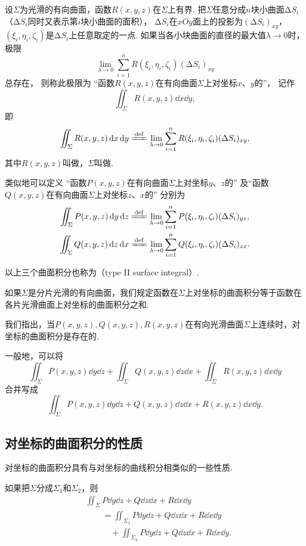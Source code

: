 设\(\Sigma\)为光滑的有向曲面，函数\(R(x,y,z)\)在\(\Sigma\)上有界.
把\(\Sigma\)任意分成\(n\)块小曲面\(\increment S_i\)%
（\(\increment S_i\)同时又表示第\(i\)块小曲面的面积），
\(\increment S_i\)在\(xOy\)面上的投影为\((\increment S_i)_{xy}\)，
\((\xi_i,\eta_i,\zeta_i)\)是\(\increment S_i\)上任意取定的一点.
如果当各小块曲面的直径的最大值\(\lambda\to0\)时，极限\[
	\lim_{\lambda\to0}
	\sum_{i=1}^n
	R(\xi_i,\eta_i,\zeta_i)
	(\increment S_i)_{xy}
\]总存在，
则称此极限为
“函数\(R(x,y,z)\)在有向曲面\(\Sigma\)上对坐标\(x\)、\(y\)的”，
记作\[
	\iint_\Sigma R(x,y,z) \dd{x}\dd{y},
\]
即\[
	\iint_\Sigma R(x,y,z) \dd{x}\dd{y}
	\defeq
	\lim_{\lambda\to0}
	\sum_{i=1}^n
	R(\xi_i,\eta_i,\zeta_i)
	(\increment S_i)_{xy},
\]
其中\(R(x,y,z)\)叫做，\(\Sigma\)叫做.

类似地可以定义
“函数\(P(x,y,z)\)在有向曲面\(\Sigma\)上对坐标\(y\)、\(z\)的”
及“函数\(Q(x,y,z)\)在有向曲面\(\Sigma\)上对坐标\(z\)、\(x\)的”
分别为\begin{gather*}
	\iint_\Sigma P(x,y,z) \dd{y}\dd{z}
	\defeq
	\lim_{\lambda\to0}
	\sum_{i=1}^n P(\xi_i,\eta_i,\zeta_i) (\increment S_i)_{yz}, \\
	\iint_\Sigma Q(x,y,z) \dd{z}\dd{x}
	\defeq
	\lim_{\lambda\to0}
	\sum_{i=1}^n Q(\xi_i,\eta_i,\zeta_i) (\increment S_i)_{zx}.
\end{gather*}

以上三个曲面积分也称为（type II surface integral）.

如果\(\Sigma\)是分片光滑的有向曲面，我们规定函数在\(\Sigma\)上对坐标的曲面积分等于函数在各片光滑曲面上对坐标的曲面积分之和.

我们指出，当\(P(x,y,z),Q(x,y,z),R(x,y,z)\)在有向光滑曲面\(\Sigma\)上连续时，对坐标的曲面积分是存在的.

一般地，可以将\[
\iint_\Sigma P(x,y,z) \dd{y}\dd{z}
+\iint_\Sigma Q(x,y,z) \dd{z}\dd{x}
+\iint_\Sigma R(x,y,z) \dd{x}\dd{y}
\]合并写成\[
\iint_\Sigma{P(x,y,z)\dd{y}\dd{z}+Q(x,y,z)\dd{z}\dd{x}+R(x,y,z)\dd{x}\dd{y}}.
\]

\subsection{对坐标的曲面积分的性质}
对坐标的曲面积分具有与对坐标的曲线积分相类似的一些性质.
\begin{property}
如果把\(\Sigma\)分成\(\Sigma_1\)和\(\Sigma_2\)，则\begin{align*}
&\iint_\Sigma{P\dd{y}\dd{z}+Q\dd{z}\dd{x}+R\dd{x}\dd{y}} \\
&\qquad=\iint_{\Sigma_1}{P\dd{y}\dd{z}+Q\dd{z}\dd{x}+R\dd{x}\dd{y}} \\
&\qquad\quad+\iint_{\Sigma_2}{P\dd{y}\dd{z}+Q\dd{z}\dd{x}+R\dd{x}\dd{y}}.
\end{align*}
\end{property}

